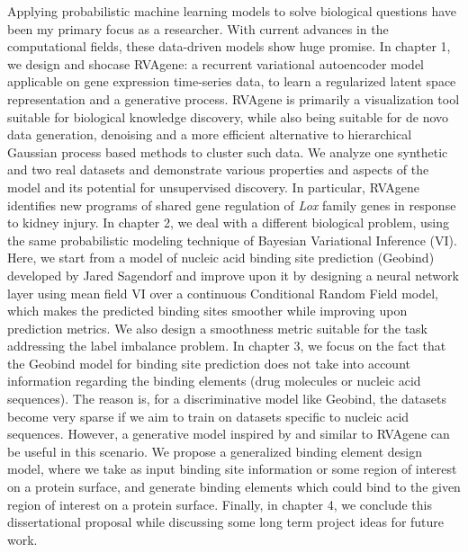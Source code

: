 Applying probabilistic machine learning models to solve biological questions have been my primary focus as a researcher. 
With current advances in the computational fields, these data-driven models show huge promise. 
In chapter 1, we design and shocase RVAgene: a recurrent variational
autoencoder model applicable on gene expression time-series data, to learn a regularized latent
space representation and a generative process. RVAgene is primarily a visualization tool suitable for biological 
knowledge discovery, while also being suitable for de novo data generation, denoising and a more
efficient alternative to hierarchical Gaussian process based methods to cluster such data. We
analyze one synthetic and two real datasets and demonstrate various properties and aspects of the
model and its potential for unsupervised discovery.  In particular, RVAgene identifies new programs of 
shared gene regulation of \textit{Lox} family genes in response to kidney injury. In
chapter 2, we deal with a different biological problem, using the same probabilistic modeling
technique of Bayesian Variational Inference (VI). Here, we start from a model of nucleic acid binding site
prediction (Geobind) developed by Jared Sagendorf and improve upon it by designing a neural network layer using mean field
VI over a continuous Conditional Random Field model, which makes the predicted binding sites
smoother while improving upon prediction metrics. We also design a smoothness metric suitable for
the task addressing the label imbalance problem. In chapter 3, we focus on the fact that the Geobind
model for binding site prediction does not take into account information regarding the binding
elements (drug molecules or nucleic acid sequences). The reason is, for a discriminative model like
Geobind, the datasets become very sparse if we aim to train on datasets specific to nucleic acid
sequences. However, a generative model inspired by and similar to RVAgene can be useful in this
scenario. We propose a generalized binding element design model, where we take as input binding site
information or some region of interest on a protein surface, and generate binding elements which
could bind to the given region of interest on a protein surface. Finally, in chapter 4, we conclude
this dissertational proposal while discussing some long term project ideas for future work.
